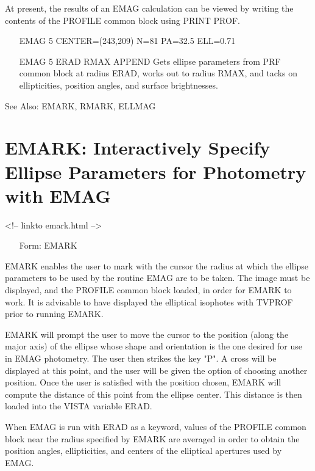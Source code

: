 At present, the results of an EMAG calculation can be viewed by writing the
contents of the PROFILE common block using PRINT PROF.

\begin{itemize}
  \item[EMAG 5 CENTER=(243,209) N=81 PA=32.5 ELL=0.71\hfill]{}

  \item[EMAG 5 ERAD RMAX APPEND\hfill]{Gets ellipse parameters from PRF
       common block at radius ERAD, works out to radius RMAX, and tacks on
       ellipticities, position angles, and surface brightnesses.}
\end{itemize}

See Also: EMARK, RMARK, ELLMAG


\section{EMARK: Interactively Specify Ellipse Parameters for 
        Photometry with EMAG}
\begin{rawhtml}
<!-- linkto emark.html -->
\end{rawhtml}
\begin{itemize}
  \item[Form: EMARK\hfill]{}
\end{itemize}

EMARK enables the user to mark with the cursor the radius at which the
ellipse parameters to be used by the routine EMAG are to be taken. The
image must be displayed, and the PROFILE common block loaded, in order for
EMARK to work. It is advisable to have displayed the elliptical isophotes
with TVPROF prior to running EMARK.

EMARK will prompt the user to move the cursor to the position (along the
major axis) of the ellipse whose shape and orientation is the one desired
for use in EMAG photometry. The user then strikes the key "P". A cross will
be displayed at this point, and the user will be given the option of
choosing another position. Once the user is satisfied with the position
chosen, EMARK will compute the distance of this point from the ellipse
center. This distance is then loaded into the VISTA variable ERAD.

When EMAG is run with ERAD as a keyword, values of the PROFILE common block
near the radius specified by EMARK are averaged in order to obtain the
position angles, ellipticities, and centers of the elliptical apertures
used by EMAG.

